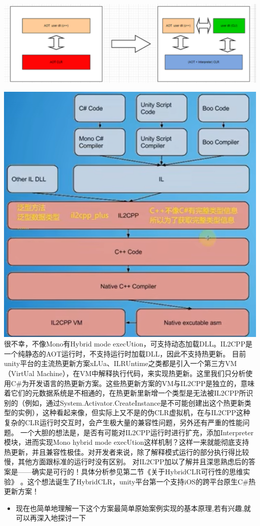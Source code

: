 \documentclass[9pt, b5paper]{article}
\begin{document}
\includegraphics[width=.9\linewidth]{./pic/readme_20220930_082537.png}

\includegraphics[width=.9\linewidth]{./pic/readme_20220930_165543.png}
很不幸，不像Mono有Hybrid mode execUtion，可支持动态加载DLL。IL2CPP是一个纯静态的AOT运行时，不支持运行时加载DLL，因此不支持热更新。
目前unity平台的主流热更新方案xLUa、ILRUntime之类都是引入一个第三方VM（VirtUal Machine），在VM中解释执行代码，来实现热更新。这里我们只分析使用C\#为开发语言的热更新方案。这些热更新方案的VM与IL2CPP是独立的，意味着它们的元数据系统是不相通的，在热更新里新增一个类型是无法被IL2CPP所识别的（例如，通过System.Activator.CreateInstance是不可能创建出这个热更新类型的实例），这种看起来像，但实际上又不是的伪CLR虚拟机，在与IL2CPP这种复杂的CLR运行时交互时，会产生极大量的兼容性问题，另外还有严重的性能问题。
一个大胆的想法是，是否有可能对IL2CPP运行时进行扩充，添加Interpreter模块，进而实现Mono hybrid mode execUtion这样机制？这样一来就能彻底支持热更新，并且兼容性极佳。对开发者来说，除了解释模式运行的部分执行得比较慢，其他方面跟标准的运行时没有区别。
对IL2CPP加以了解并且深思熟虑后的答案是——确实是可行的！具体分析参见第二节《关于HybridCLR可行性的思维实验》 。这个想法诞生了HybridCLR，unity平台第一个支持iOS的跨平台原生C\#热更新方案！
\begin{itemize}
\item 现在也简单地理解一下这个方案最简单原始案例实现的基本原理,若有兴趣,就可以再深入地探讨一下
\end{itemize}
\end{document}
